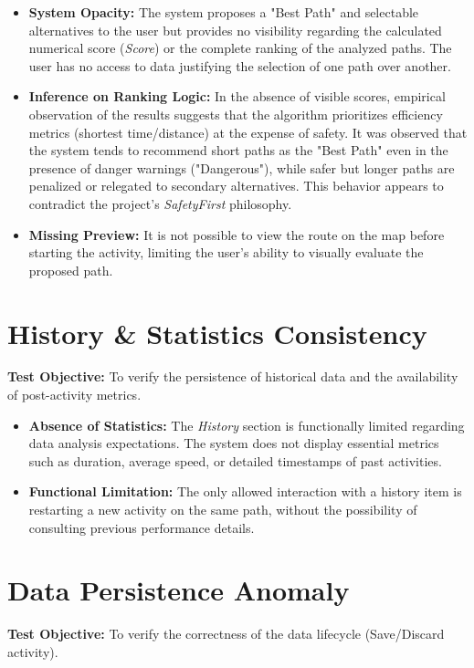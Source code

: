 \begin{itemize}
    \item \textbf{System Opacity:} The system proposes a "Best Path" and selectable alternatives to the user but provides no visibility regarding the calculated numerical score (\textit{Score}) or the complete ranking of the analyzed paths. The user has no access to data justifying the selection of one path over another.
    \item \textbf{Inference on Ranking Logic:} In the absence of visible scores, empirical observation of the results suggests that the algorithm prioritizes efficiency metrics (shortest time/distance) at the expense of safety. It was observed that the system tends to recommend short paths as the "Best Path" even in the presence of danger warnings ("Dangerous"), while safer but longer paths are penalized or relegated to secondary alternatives. This behavior appears to contradict the project's \textit{SafetyFirst} philosophy.
    \item \textbf{Missing Preview:} It is not possible to view the route on the map before starting the activity, limiting the user's ability to visually evaluate the proposed path.
\end{itemize}

\section{History \& Statistics Consistency}
\textbf{Test Objective:} To verify the persistence of historical data and the availability of post-activity metrics.

\begin{itemize}
    \item \textbf{Absence of Statistics:} The \textit{History} section is functionally limited regarding data analysis expectations. The system does not display essential metrics such as duration, average speed, or detailed timestamps of past activities.
    \item \textbf{Functional Limitation:} The only allowed interaction with a history item is restarting a new activity on the same path, without the possibility of consulting previous performance details.
\end{itemize}

\section{Data Persistence Anomaly}
\textbf{Test Objective:} To verify the correctness of the data lifecycle (Save/Discard activity).

